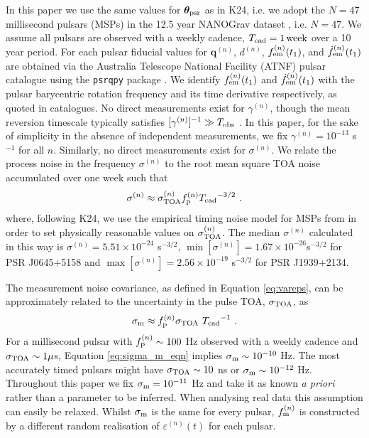 \documentclass[fleqn,usenatbib,useAMS]{mnras}
\begin{document}
In this paper we use the same values for $\boldsymbol{\theta}_{\rm psr}$ as in K24, i.e. we adopt the $N=47$ millisecond pulsars (MSPs) in the 12.5 year NANOGrav dataset \citep{2020ApJ...905L..34A}, i.e. $N = 47$. We assume all pulsars are observed with a weekly cadence, $T_{\rm cad} = 1 \,{\rm week}$ over a 10 year period. For each pulsar fiducial values for ${\boldsymbol{q}}^{(n)}$, $d^{(n)}$, $f_{\rm em}^{(n)}(t_1)$, and $\dot{f}^{(n)}_{\rm em}(t_1)$ are obtained via the Australia Telescope National Facility (ATNF) pulsar catalogue \citep{Manchester2005} using the \texttt{psrqpy} package \citep{psrqpy}. We identify $f_{\rm em}^{(n)} (t_1)$ and $\dot{f}_{\rm em}^{(n)} (t_1)$ with the pulsar barycentric rotation frequency and its time derivative respectively, as quoted in catalogues. No direct measurements exist for $\gamma^{(n)}$, though the mean reversion timescale typically satisfies $[\gamma^{(n)}]^{-1} \gg T_{\rm obs}$ \citep{Price2012,Myers2021MNRAS.502.3113M,Meyers2021,Vargas}. In this paper, for the sake of simplicity in the absence of independent measurements, we fix $\gamma^{(n)} = 10^{-13}$ s$^{-1}$ for all $n$. Similarly, no direct measurements exist for $\sigma^{(n)}$.   We relate the process noise in the frequency $\sigma^{(n)}$ to the root mean square TOA noise accumulated over one week such that
\begin{eqnarray}
	\sigma^{(n)} \approx \sigma_{\rm TOA}^{(n)} f_{\rm p}^{(n)} {T_{\rm cad}}^{-3/2} \ . \label{eq:sigmap_f}
\end{eqnarray}
where, following K24, we use the empirical timing noise model for MSPs from \cite{Shannon2010ApJ...725.1607S} in order to set physically reasonable values on $\sigma_{\rm TOA}^{(n)}$.  The median $\sigma^{(n)}$ calculated in this way is $\sigma^{(n)} = 5.51 \times 10^{-24} $ s$^{-3/2}$, $\min [ \sigma^{(n)} ] = 1.67 \times 10^{-26}$s$^{-3/2}$ for PSR J0645+5158 and $\max [ \sigma^{(n)} ] = 2.56 \times 10^{-19}$ s$^{-3/2}$ for PSR J1939+2134. \newline 


The measurement noise covariance, as defined in Equation \eqref{eq:vareps}, can be approximately related to the uncertainty in the pulse TOA, $\sigma_{\rm TOA}$, as
\begin{equation}
	\sigma_{\rm m} \approx f_{\rm p}^{(n)} \sigma_{\rm TOA} \ {T_{\rm cad}}^{-1} \ . \label{eq:sigma_m_eqn}
\end{equation}
For a millisecond pulsar with $f_{\rm p}^{(n)} \sim 100$ Hz observed with a weekly cadence and $\sigma_{\rm TOA} \sim 1 \mu$s,  Equation \eqref{eq:sigma_m_eqn} implies $\sigma_{\rm m} \sim 10^{-10}$ Hz. The most accurately timed pulsars might have $\sigma_{\rm TOA} \sim 10 $ ns or $\sigma_{\rm m} \sim 10^{-12}$ Hz. Throughout this paper we fix $\sigma_{\rm m} = 10^{-11}$ Hz and take it as known \textit{a priori} rather than a parameter to be inferred. When analysing real data this assumption can easily be relaxed. Whilst $\sigma_{\rm m}$ is the same for every pulsar, $f_{\rm m} ^{(n)}$ is constructed by a different random realisation of $\varepsilon^{(n)}(t)$ for each pulsar. \newline  
\end{document}
